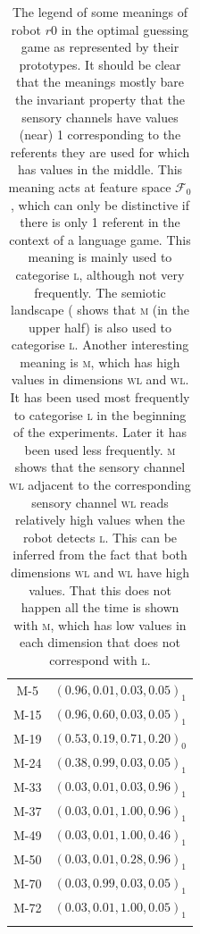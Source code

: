 \begin{table}
\centering
\begin{tabular}{cc}
\lsptoprule
M-5 & $(0.96,0.01,0.03,0.05)_1$\\%
M-15 & $(0.96,0.60,0.03,0.05)_1$\\%
M-19 & $(0.53,0.19,0.71,0.20)_0$\\%
M-24 & $(0.38,0.99,0.03,0.05)_1$\\%
M-33 & $(0.03,0.01,0.03,0.96)_1$\\%
M-37 & $(0.03,0.01,1.00,0.96)_1$\\%
M-49 & $(0.03,0.01,1.00,0.46)_1$\\%
M-50 & $(0.03,0.01,0.28,0.96)_1$\\%
M-70 & $(0.03,0.99,0.03,0.05)_1$\\%
M-72 & $(0.03,0.01,1.00,0.05)_1$\\%
\lspbottomrule
\end{tabular}
\caption{The legend of some meanings of robot $r0$ in the optimal guessing game as represented by their prototypes. It should be clear that the meanings mostly bare the invariant property that the sensory channels have values (near) 1 corresponding to the referents they are used for which has values in the middle. This meaning acts at feature space ${\mathcal F}_0$, which can only be distinctive if there is only 1 referent in the context of a language game. This meaning is mainly used to categorise \textsc{l}, although not very frequently. The semiotic landscape ( shows that \textsc{m} (in the upper half) is also used to categorise \textsc{l}. Another interesting meaning is \textsc{m}, which has high values in dimensions \textsc{wl} and \textsc{wl}. It has been used most frequently to categorise \textsc{l} in the beginning of the experiments. Later it has been used less frequently. \textsc{m} shows that the sensory channel \textsc{wl} adjacent to the corresponding sensory channel \textsc{wl} reads relatively high values when the robot detects \textsc{l}. This can be inferred from the fact that both dimensions \textsc{wl} and \textsc{wl} have high values. That this does not happen all the time is shown with \textsc{m}, which has low values in each dimension that does not correspond with \textsc{l}.}
\label{t:opt:legend}
\end{table}
\clearpage
